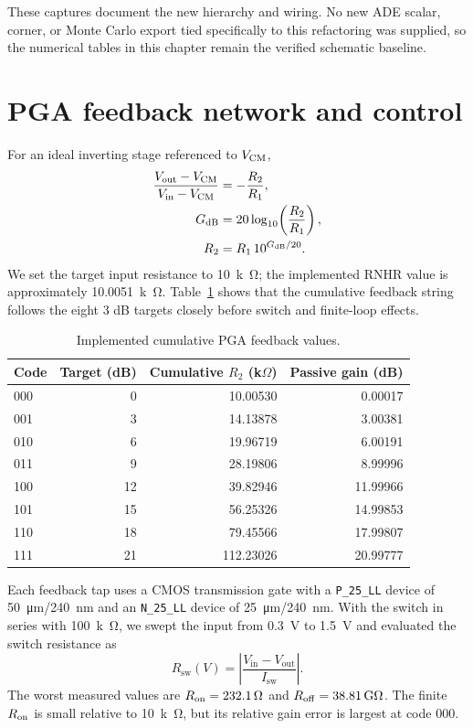 These captures document the new hierarchy and wiring. No new ADE scalar, corner, or Monte Carlo export tied specifically to this refactoring was supplied, so the numerical tables in this chapter remain the verified schematic baseline.

\section{PGA feedback network and control}

For an ideal inverting stage referenced to \(V_{\mathrm{CM}}\),
\begin{align}
\frac{V_{\mathrm{out}}-V_{\mathrm{CM}}}{V_{\mathrm{in}}-V_{\mathrm{CM}}}
&=-\frac{R_2}{R_1}, \\
G_{\mathrm{dB}}
&=20\log_{10}\!\left(\frac{R_2}{R_1}\right), \\
R_2
&=R_1\,10^{G_{\mathrm{dB}}/20}.
\end{align}
We set the target input resistance to \SI{10}{k\ohm}; the implemented RNHR value is approximately \SI{10.0051}{k\ohm}. Table~\ref{tab:pga-resistors} shows that the cumulative feedback string follows the eight 3 dB targets closely before switch and finite-loop effects.

\begin{table}[htbp]
\centering
\caption{Implemented cumulative PGA feedback values.}
\label{tab:pga-resistors}
\footnotesize
\begin{tabular}{@{}lrrr@{}}
\toprule
Code & Target (dB) & Cumulative $R_2$ (k$\Omega$) & Passive gain (dB) \\
\midrule
000 & 0  & 10.00530  & 0.00017 \\
001 & 3  & 14.13878  & 3.00381 \\
010 & 6  & 19.96719  & 6.00191 \\
011 & 9  & 28.19806  & 8.99996 \\
100 & 12 & 39.82946  & 11.99966 \\
101 & 15 & 56.25326  & 14.99853 \\
110 & 18 & 79.45566  & 17.99807 \\
111 & 21 & 112.23026 & 20.99777 \\
\bottomrule
\end{tabular}
\end{table}

Each feedback tap uses a CMOS transmission gate with a \texttt{P\_25\_LL} device of \SI{50}{\micro m}/\SI{240}{nm} and an \texttt{N\_25\_LL} device of \SI{25}{\micro m}/\SI{240}{nm}. With the switch in series with \SI{100}{k\ohm}, we swept the input from \SI{0.3}{V} to \SI{1.5}{V} and evaluated the switch resistance as
\begin{equation}
R_{\mathrm{sw}}(V)=\left|\frac{V_{\mathrm{in}}-V_{\mathrm{out}}}{I_{\mathrm{sw}}}\right|.
\end{equation}
The worst measured values are \(R_{\mathrm{on}}=\SI{232.1}{\ohm}\) and \(R_{\mathrm{off}}=\SI{38.81}{\giga\ohm}\). The finite \(R_{\mathrm{on}}\) is small relative to \SI{10}{k\ohm}, but its relative gain error is largest at code 000.

